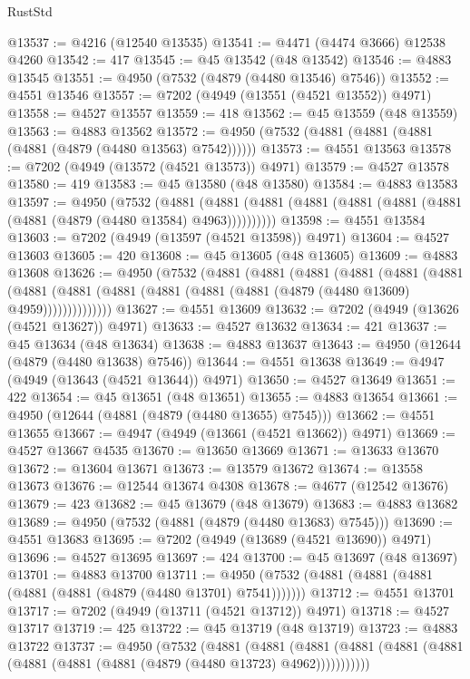 \begin{lexlean}{RustStd}
\begin{coremodule}
@13537 := @4216 (@12540 @13535)
@13541 := @4471 (@4474 @3666) @12538 @4260
@13542 := 417
@13545 := @45 @13542 (@48 @13542)
@13546 := @4883 @13545
@13551 := @4950 (@7532 (@4879 (@4480 @13546) @7546))
@13552 := @4551 @13546
@13557 := @7202 (@4949 (@13551 (@4521 @13552)) @4971)
@13558 := @4527 @13557
@13559 := 418
@13562 := @45 @13559 (@48 @13559)
@13563 := @4883 @13562
@13572 := @4950 (@7532 (@4881 (@4881 (@4881 (@4881 (@4879 (@4480 @13563) @7542))))))
@13573 := @4551 @13563
@13578 := @7202 (@4949 (@13572 (@4521 @13573)) @4971)
@13579 := @4527 @13578
@13580 := 419
@13583 := @45 @13580 (@48 @13580)
@13584 := @4883 @13583
@13597 := @4950
    (@7532
      (@4881 (@4881 (@4881 (@4881 (@4881 (@4881 (@4881 (@4881 (@4879 (@4480 @13584) @4963))))))))))
@13598 := @4551 @13584
@13603 := @7202 (@4949 (@13597 (@4521 @13598)) @4971)
@13604 := @4527 @13603
@13605 := 420
@13608 := @45 @13605 (@48 @13605)
@13609 := @4883 @13608
@13626 := @4950
    (@7532
      (@4881
        (@4881
          (@4881
            (@4881
              (@4881
                (@4881
                  (@4881
                    (@4881 (@4881 (@4881 (@4881 (@4881 (@4879 (@4480 @13609) @4959))))))))))))))
@13627 := @4551 @13609
@13632 := @7202 (@4949 (@13626 (@4521 @13627)) @4971)
@13633 := @4527 @13632
@13634 := 421
@13637 := @45 @13634 (@48 @13634)
@13638 := @4883 @13637
@13643 := @4950 (@12644 (@4879 (@4480 @13638) @7546))
@13644 := @4551 @13638
@13649 := @4947 (@4949 (@13643 (@4521 @13644)) @4971)
@13650 := @4527 @13649
@13651 := 422
@13654 := @45 @13651 (@48 @13651)
@13655 := @4883 @13654
@13661 := @4950 (@12644 (@4881 (@4879 (@4480 @13655) @7545)))
@13662 := @4551 @13655
@13667 := @4947 (@4949 (@13661 (@4521 @13662)) @4971)
@13669 := @4527 @13667 @4535
@13670 := @13650 @13669
@13671 := @13633 @13670
@13672 := @13604 @13671
@13673 := @13579 @13672
@13674 := @13558 @13673
@13676 := @12544 @13674 @4308
@13678 := @4677 (@12542 @13676)
@13679 := 423
@13682 := @45 @13679 (@48 @13679)
@13683 := @4883 @13682
@13689 := @4950 (@7532 (@4881 (@4879 (@4480 @13683) @7545)))
@13690 := @4551 @13683
@13695 := @7202 (@4949 (@13689 (@4521 @13690)) @4971)
@13696 := @4527 @13695
@13697 := 424
@13700 := @45 @13697 (@48 @13697)
@13701 := @4883 @13700
@13711 := @4950 (@7532 (@4881 (@4881 (@4881 (@4881 (@4881 (@4879 (@4480 @13701) @7541)))))))
@13712 := @4551 @13701
@13717 := @7202 (@4949 (@13711 (@4521 @13712)) @4971)
@13718 := @4527 @13717
@13719 := 425
@13722 := @45 @13719 (@48 @13719)
@13723 := @4883 @13722
@13737 := @4950
    (@7532
      (@4881
        (@4881
          (@4881 (@4881 (@4881 (@4881 (@4881 (@4881 (@4881 (@4879 (@4480 @13723) @4962)))))))))))

\end{coremodule}
\end{lexlean}
